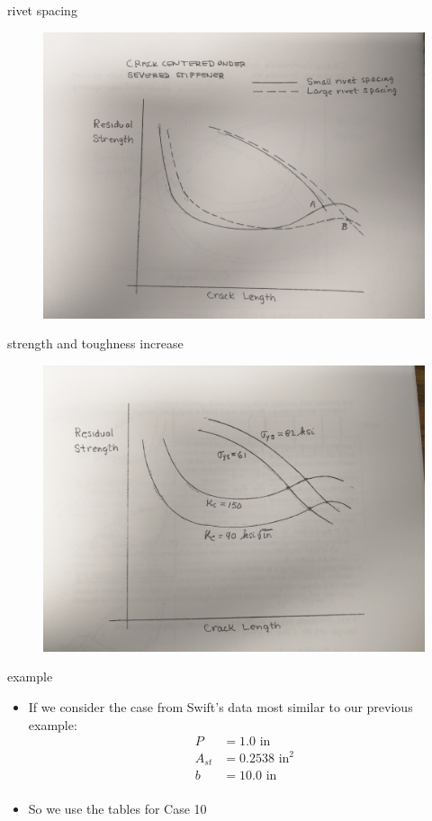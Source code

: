 \documentclass[10pt]{beamer}
\begin{document}
\begin{frame}{rivet spacing}
\begin{figure}
\centering
\includegraphics[width=0.7\linewidth]{rivet_spacing}
\label{fig:rivet_spacing}
\end{figure}
\end{frame}

\begin{frame}{strength and toughness increase}
\begin{figure}
\centering
\includegraphics[width=0.7\linewidth]{strength_increase}
\label{fig:strength_increase}
\end{figure}
\end{frame}

\begin{frame}{example}
	\begin{itemize}
		\item If we consider the case from Swift's data most similar to our previous example:
		\begin{align*}
		P &= 1.0 \text{ in}\\
		A_{st} &= 0.2538 \text{ in}^2\\
		b &= 10.0 \text{ in}\\
		\end{align*}
		\item So we use the tables for Case 10
	\end{itemize}
\end{frame}
\end{document}

